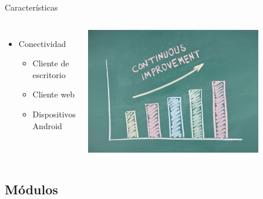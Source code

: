\begin{frame}{Características}
\begin{columns}
\begin{itemize}
            \item Conectividad
                \begin{itemize}
                    \item Cliente de escritorio
                    \item Cliente web
                    \item Dispositivos Android
                \end{itemize}
        \end{itemize}
        \begin{center}
        \includegraphics[width=0.8\textwidth]{./Images/improvement.jpg}
        \end{center}
        \end{columns}
    \end{frame}

    \subsection{Módulos}

